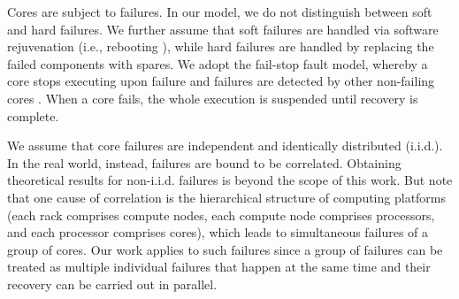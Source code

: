 
Cores are subject to failures. In our model, we do not distinguish between soft and hard failures. We further assume that soft failures are handled via software rejuvenation (i.e., rebooting \cite{466961}), while hard failures are handled by replacing the failed components with spares. We adopt the fail-stop fault model, whereby a core stops executing upon failure and failures are detected by other non-failing cores \cite{gartner_faults_1999,cristian_comm_1991}. When a core fails, the whole execution is suspended until recovery is complete. 

We assume that core failures are independent and identically distributed (i.i.d.). In the real world, instead, failures are bound to be correlated. Obtaining theoretical results for non-i.i.d. failures is beyond the scope of this work. But note that one cause of correlation is the hierarchical structure of computing platforms (each rack comprises compute nodes, each compute node comprises processors, and each processor comprises cores), which leads to simultaneous failures of a group of cores. Our work applies to such failures since a group of failures can be treated as multiple individual failures that happen at the same time and their recovery can be carried out in parallel.


